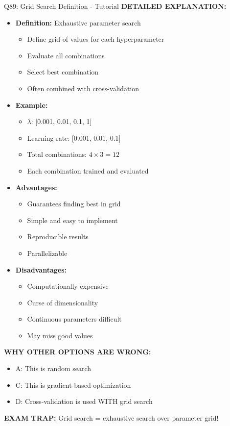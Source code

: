 \documentclass[8pt]{beamer}
\begin{document}
\begin{frame}{Q89: Grid Search Definition - Tutorial}
		\vspace{0.05cm}
		\textbf{DETAILED EXPLANATION:}
		\begin{itemize}
			\item \textbf{Definition:} Exhaustive parameter search
			\begin{itemize}
				\item Define grid of values for each hyperparameter
				\item Evaluate all combinations
				\item Select best combination
				\item Often combined with cross-validation
			\end{itemize}
			\item \textbf{Example:}
			\begin{itemize}
				\item $\lambda$: [0.001, 0.01, 0.1, 1]
				\item Learning rate: [0.001, 0.01, 0.1]
				\item Total combinations: $4 \times 3 = 12$
				\item Each combination trained and evaluated
			\end{itemize}
			\item \textbf{Advantages:}
			\begin{itemize}
				\item Guarantees finding best in grid
				\item Simple and easy to implement
				\item Reproducible results
				\item Parallelizable
			\end{itemize}
			\item \textbf{Disadvantages:}
			\begin{itemize}
				\item Computationally expensive
				\item Curse of dimensionality
				\item Continuous parameters difficult
				\item May miss good values
			\end{itemize}
		\end{itemize}
		
		\vspace{0.05cm}
		\textcolor{myred}{\textbf{WHY OTHER OPTIONS ARE WRONG:}}
		\begin{itemize}
			\item \textcolor{myred}{A:} This is random search
			\item \textcolor{myred}{C:} This is gradient-based optimization
			\item \textcolor{myred}{D:} Cross-validation is used WITH grid search
		\end{itemize}
		
		\textcolor{myred}{\textbf{EXAM TRAP:}} Grid search = exhaustive search over parameter grid!
	\end{frame}
	
\end{document}
